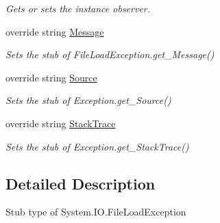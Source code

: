 \begin{DoxyCompactItemize}
\begin{DoxyCompactList}\small\item\em Gets or sets the instance observer.\end{DoxyCompactList}\item 
override string \hyperlink{class_system_1_1_i_o_1_1_fakes_1_1_stub_file_load_exception_a0aa85398f705e37e88b6c2c0773ca898}{Message}
\begin{DoxyCompactList}\small\item\em Sets the stub of File\-Load\-Exception.\-get\-\_\-\-Message()\end{DoxyCompactList}\item 
override string \hyperlink{class_system_1_1_i_o_1_1_fakes_1_1_stub_file_load_exception_a27a9053e5bc71b4116177dceee35a7af}{Source}
\begin{DoxyCompactList}\small\item\em Sets the stub of Exception.\-get\-\_\-\-Source()\end{DoxyCompactList}\item 
override string \hyperlink{class_system_1_1_i_o_1_1_fakes_1_1_stub_file_load_exception_a2f1d840c6a67113a7ca7f100c4b1e27a}{Stack\-Trace}
\begin{DoxyCompactList}\small\item\em Sets the stub of Exception.\-get\-\_\-\-Stack\-Trace()\end{DoxyCompactList}\end{DoxyCompactItemize}


\subsection{Detailed Description}
Stub type of System.\-I\-O.\-File\-Load\-Exception



